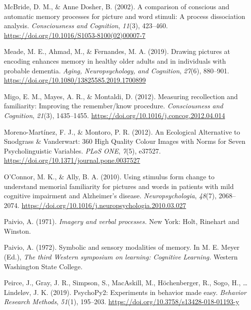 \documentclass[
  11pt,
]{article}
\begin{document}
\leavevmode\hypertarget{ref-mcbride2002}{}%
McBride, D. M., \& Anne Dosher, B. (2002). A comparison of conscious and
automatic memory processes for picture and word stimuli: A process
dissociation analysis. \emph{Consciousness and Cognition}, \emph{11}(3),
423--460. \url{https://doi.org/10.1016/S1053-8100(02)00007-7}

\leavevmode\hypertarget{ref-meade2019}{}%
Meade, M. E., Ahmad, M., \& Fernandes, M. A. (2019). Drawing pictures at
encoding enhances memory in healthy older adults and in individuals with
probable dementia. \emph{Aging, Neuropsychology, and Cognition},
\emph{27}(6), 880--901.
\url{https://doi.org/10.1080/13825585.2019.1700899}

\leavevmode\hypertarget{ref-migo2012}{}%
Migo, E. M., Mayes, A. R., \& Montaldi, D. (2012). Measuring
recollection and familiarity: Improving the remember/know procedure.
\emph{Consciousness and Cognition}, \emph{21}(3), 1435--1455.
\url{https://doi.org/10.1016/j.concog.2012.04.014}

\leavevmode\hypertarget{ref-moreno-martinez2012}{}%
Moreno-Martínez, F. J., \& Montoro, P. R. (2012). An Ecological
Alternative to Snodgrass \& Vanderwart: 360 High Quality Colour Images
with Norms for Seven Psycholinguistic Variables. \emph{PLoS ONE},
\emph{7}(5), e37527. \url{https://doi.org/10.1371/journal.pone.0037527}

\leavevmode\hypertarget{ref-oconnor2010}{}%
O'Connor, M. K., \& Ally, B. A. (2010). Using stimulus form change to
understand memorial familiarity for pictures and words in patients with
mild cognitive impairment and Alzheimer's disease.
\emph{Neuropsychologia}, \emph{48}(7), 2068--2074.
\url{https://doi.org/10.1016/j.neuropsychologia.2010.03.027}

\leavevmode\hypertarget{ref-paivio1971}{}%
Paivio, A. (1971). \emph{Imagery and verbal processes.} New York: Holt,
Rinehart and Winston.

\leavevmode\hypertarget{ref-paivio1972}{}%
Paivio, A. (1972). Symbolic and sensory modalities of memory. In M. E.
Meyer (Ed.), \emph{The third Western symposium on learning: Cognitive
Learning.} Western Washington State College.

\leavevmode\hypertarget{ref-peirce2019}{}%
Peirce, J., Gray, J. R., Simpson, S., MacAskill, M., Höchenberger, R.,
Sogo, H., \ldots{} Lindeløv, J. K. (2019). PsychoPy2: Experiments in
behavior made easy. \emph{Behavior Research Methods}, \emph{51}(1),
195--203. \url{https://doi.org/10.3758/s13428-018-01193-y}
\end{document}
